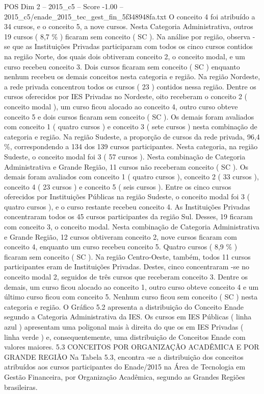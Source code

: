 \begin{textsample}{POS Dim 2 – 2015\_c5 – Score -1.00 – 2015\_c5/enade\_2015\_tec\_gest\_fin\_5f348948fa.txt}
O conceito 4 foi atribuído a 34 cursos, e o conceito 5, a nove cursos.
Nesta Categoria Administrativa, outros 19 cursos ( 8,7 \% ) ficaram sem conceito ( SC ).
Na análise por região, observa -se que as Instituições Privadas participaram com todos os cinco cursos contidos na região Norte, dos quais dois obtiveram conceito 2, o conceito modal, e um curso recebeu conceito 3.
Dois cursos ficaram sem conceito ( SC ) enquanto nenhum recebeu os demais conceitos nesta categoria e região.
Na região Nordeste, a rede privada concentrou todos os cursos ( 23 ) contidos nessa região.
Dentre os cursos oferecidos por IES Privadas no Nordeste, oito receberam o conceito 2 ( conceito modal ), um curso ficou alocado ao conceito 4, outro curso obteve conceito 5 e dois cursos ficaram sem conceito ( SC ).
Os demais foram avaliados com conceito 1 ( quatro cursos ) e conceito 3 ( sete cursos ) nesta combinação de categoria e região.
Na região Sudeste, a proporção de cursos da rede privada, 96,4 \%, correspondendo a 134 dos 139 cursos participantes.
Nesta categoria, na região Sudeste, o conceito modal foi 3 ( 57 cursos ).
Nesta combinação de Categoria Administrativa e Grande Região, 11 cursos não receberam conceito ( SC ).
Os demais foram avaliados com conceito 1 ( quatro cursos ), conceito 2 ( 33 cursos ), conceito 4 ( 23 cursos ) e conceito 5 ( seis cursos ).
Entre os cinco cursos oferecidos por Instituições Públicas na região Sudeste, o conceito modal foi 3 ( quatro cursos ), e o curso restante recebeu conceito 4.
As Instituições Privadas concentraram todos os 45 cursos participantes da região Sul.
Desses, 19 ficaram com conceito 3, o conceito modal.
Nesta combinação de Categoria Administrativa e Grande Região, 12 cursos obtiveram conceito 2, nove cursos ficaram com conceito 4, enquanto um curso recebeu conceito 5.
Quatro cursos ( 8,9 \% ) ficaram sem conceito ( SC ).
Na região Centro-Oeste, também, todos 11 cursos participantes eram de Instituições Privadas.
Destes, cinco concentraram -se no conceito modal 2, seguidos de três cursos que receberam conceito 3.
Dentre os demais, um curso ficou alocado ao conceito 1, outro curso obteve conceito 4 e um último curso ficou com conceito 5.
Nenhum curso ficou sem conceito ( SC ) nesta categoria e região.
O Gráfico 5.2 apresenta a distribuição do Conceito Enade segundo a Categoria Administrativa da IES.
Os cursos em IES Públicas ( linha azul ) apresentam uma poligonal mais à direita do que os em IES Privadas ( linha verde ) e, consequentemente, uma distribuição de Conceitos Enade com valores maiores. 5.3 CONCEITOS POR ORGANIZAÇÃO ACADÊMICA E POR GRANDE REGIÃO Na Tabela 5.3, encontra -se a distribuição dos conceitos atribuídos aos cursos participantes do Enade/2015 na Área de Tecnologia em Gestão Financeira, por Organização Acadêmica, segundo as Grandes Regiões brasileiras.

\end{textsample}
